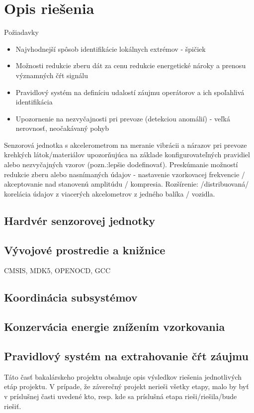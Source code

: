 \chapter{Opis riešenia}
Požiadavky
\begin{itemize}
\item Najvhodnejší spôsob identifikácie lokálnych extrémov - špičiek
\item Možnosti redukcie zberu dát za cenu redukcie energetické nároky a prenosu významných čŕt signálu
\item Pravidlový systém na definíciu udalostí záujmu operátorov a ich spoľahlivá identifikácia
\item Upozornenie na nezvyčajnosti pri prevoze (detekciou anomálií) - veľká nerovnosť, neočakávaný pohyb
\end{itemize}

Senzorová jednotka s akcelerometrom na meranie vibrácii a nárazov pri prevoze krehkých látok/materiálov upozorňujúca na základe konfigurovateľných pravidiel alebo nezvyčajných vzorov (pozn.:lepšie dodefinovať). Preskúmanie možností redukcie zberu alebo nasnímaných údajov - nastavenie vzorkovacej frekvencie / akceptovanie nad stanovenú amplitúdu / kompresia. Rozšírenie: /distribuovaná/ korelácia údajov z viacerých akcelometrov z jedného balíka / vozidla.

\section{Hardvér senzorovej jednotky}
\section{Vývojové prostredie a knižnice}
CMSIS, MDK5, OPENOCD, GCC
\section{Koordinácia subsystémov}
\section{Konzervácia energie znížením vzorkovania}
\section{Pravidlový systém na extrahovanie čŕt záujmu}


Táto časť bakalárskeho projektu obsahuje opis výsledkov riešenia jednotlivých etáp projektu. V prípade, že záverečný projekt nerieši všetky etapy, malo by byť v príslušnej časti uvedené kto, resp. kde sa príslušná etapa rieši/riešila/bude riešiť.

